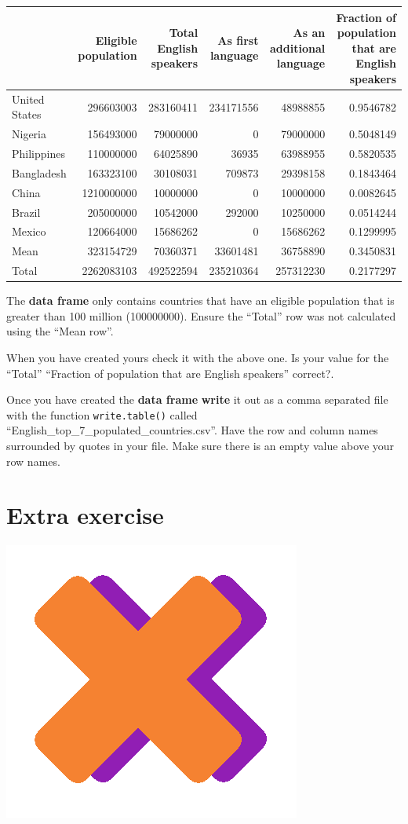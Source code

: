 \documentclass[]{book}
\begin{document}
\begin{tabular}[t]{l|r|r|r|r|r}
\hline
  & Eligible population & Total English speakers & As first language & As an additional language & Fraction of population that are English speakers\\
\hline
United States & 296603003 & 283160411 & 234171556 & 48988855 & 0.9546782\\
\hline
Nigeria & 156493000 & 79000000 & 0 & 79000000 & 0.5048149\\
\hline
Philippines & 110000000 & 64025890 & 36935 & 63988955 & 0.5820535\\
\hline
Bangladesh & 163323100 & 30108031 & 709873 & 29398158 & 0.1843464\\
\hline
China & 1210000000 & 10000000 & 0 & 10000000 & 0.0082645\\
\hline
Brazil & 205000000 & 10542000 & 292000 & 10250000 & 0.0514244\\
\hline
Mexico & 120664000 & 15686262 & 0 & 15686262 & 0.1299995\\
\hline
Mean & 323154729 & 70360371 & 33601481 & 36758890 & 0.3450831\\
\hline
Total & 2262083103 & 492522594 & 235210364 & 257312230 & 0.2177297\\
\hline
\end{tabular}

The \textbf{data frame} only contains countries that have an eligible
population that is greater than 100 million (100000000). Ensure the
``Total'' row was not calculated using the ``Mean row''.

When you have created yours check it with the above one. Is your value
for the ``Total'' ``Fraction of population that are English speakers''
correct?.

Once you have created the \textbf{data frame} \textbf{write} it out as a
comma separated file with the function \texttt{write.table()} called
``English\_top\_7\_populated\_countries.csv''. Have the row and column
names surrounded by quotes in your file. Make sure there is an empty
value above your row names.

\section{Extra exercise}\label{extra-exercise}

\begin{center}\includegraphics[width=0.2\linewidth]{figures/multiplication} \end{center}
\end{document}
